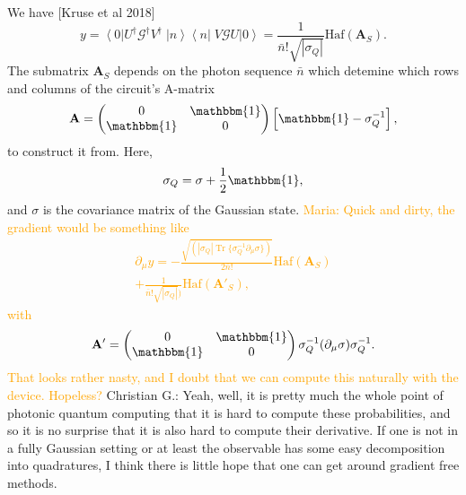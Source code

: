 \documentclass[aps,pra,10pt,twocolumn,groupedaddress,nofootinbib]{revtex4-1}
\theoremstyle{plain}
\DeclareMathOperator{\tr}{Tr}
\newcommand{\ket}[1]{\ensuremath{\left| #1 \right \rangle}}
\newcommand{\bra}[1]{\ensuremath{\left \langle #1 \right |}}
\newcommand{\ketbra}[2]{\ket{#1}\bra{#2}}
\newcommand{\G}{\mathcal{G}}
\newcommand{\maria}[1]{\textcolor{orange}{Maria: #1}}
\newcommand{\cg}[1]{\textcolor{cyan!80!black}{Christian G.: #1}}
\begin{document}
We have [Kruse et al 2018]
\[y = \bra{0}U^{\dagger} \G^{\dagger} V^{\dagger} \; \ketbra{n}{n} \; V \G U \ket{0} =  \frac{1}{\bar{n}! \sqrt{|\sigma_{Q}|} }\text{Haf}(\mathbf{A}_S).\]
The submatrix $\mathbf{A}_S$ depends on the photon sequence $\bar{n}$ which detemine which rows and columns of the circuit's A-matrix
\[ \mathbf{A} =\begin{pmatrix}0 & \mathbbm{1} \\ \mathbbm{1} & 0 \end{pmatrix} \left[ \mathbbm{1} - \sigma_Q^{-1} \right],\]
to construct it from. Here,
\[\sigma_Q = \sigma + \frac{1}{2} \mathbbm{1},\]
and $\sigma$ is the covariance matrix of the Gaussian state.
\maria{Quick and dirty, the gradient would be something like
\begin{multline}\partial_{\mu} y = -\frac{\sqrt{(|\sigma_Q| \tr \{ \sigma_Q^{-1} \partial_{\mu} \sigma \})}}{2\bar{n}! }\text{Haf}(\mathbf{A}_S) \\
+ \frac{1}{\bar{n}! \sqrt{|\sigma_{Q}|} )}\text{Haf}(\mathbf{A'}_S),
\end{multline}
with 
\[\mathbf{A}' = \begin{pmatrix}0 & \mathbbm{1} \\ \mathbbm{1} & 0 \end{pmatrix} \sigma_Q^{-1}(\partial_{\mu} \sigma) \sigma_Q^{-1}.\] 
That looks rather nasty, and I doubt that we can compute this naturally with the device. Hopeless?}
\cg{Yeah, well, it is pretty much the whole point of photonic quantum computing that it is hard to compute these probabilities, and so it is no surprise that it is also hard to compute their derivative. If one is not in a fully Gaussian setting or at least the observable has some easy decomposition into quadratures, I think there is little hope that one can get around gradient free methods.}
\end{document}
